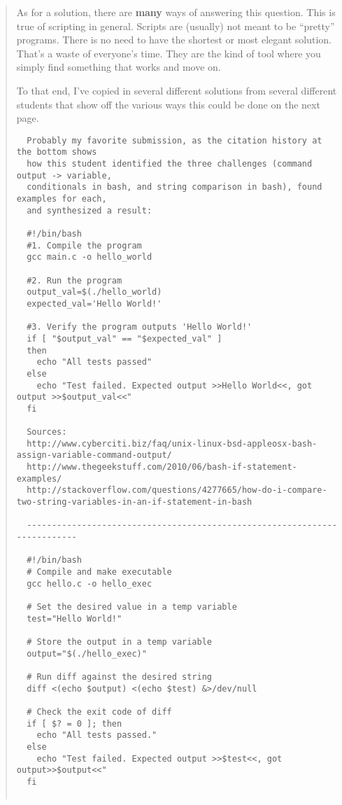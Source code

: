 \documentclass{article}
\begin{document}
\begin{quote}
  \color{violet}

  As for a solution, there are \textbf{many} ways of answering this question.
  This is true of scripting in general. Scripts are (usually) not meant to be
  ``pretty'' programs. There is no need to have the shortest or most elegant
  solution. That's a waste of everyone's time. They are the kind of tool where
  you simply find something that works and move on.

  To that end, I've copied in several different solutions from several
  different students that show off the various ways this could be done on the
  next page.

  \newpage
  \lstset{tabsize=1}
  \lstset{basicstyle=\footnotesize\ttfamily}
  \begin{lstlisting}
  Probably my favorite submission, as the citation history at the bottom shows
  how this student identified the three challenges (command output -> variable,
  conditionals in bash, and string comparison in bash), found examples for each,
  and synthesized a result:

  #!/bin/bash
  #1. Compile the program
  gcc main.c -o hello_world

  #2. Run the program
  output_val=$(./hello_world)
  expected_val='Hello World!'

  #3. Verify the program outputs 'Hello World!'
  if [ "$output_val" == "$expected_val" ]
  then
    echo "All tests passed"
  else
    echo "Test failed. Expected output >>Hello World<<, got output >>$output_val<<"
  fi

  Sources:
  http://www.cyberciti.biz/faq/unix-linux-bsd-appleosx-bash-assign-variable-command-output/
  http://www.thegeekstuff.com/2010/06/bash-if-statement-examples/
  http://stackoverflow.com/questions/4277665/how-do-i-compare-two-string-variables-in-an-if-statement-in-bash

  --------------------------------------------------------------------------

  #!/bin/bash
  # Compile and make executable
  gcc hello.c -o hello_exec

  # Set the desired value in a temp variable
  test="Hello World!"

  # Store the output in a temp variable
  output="$(./hello_exec)"

  # Run diff against the desired string
  diff <(echo $output) <(echo $test) &>/dev/null

  # Check the exit code of diff
  if [ $? = 0 ]; then
    echo "All tests passed."
  else
    echo "Test failed. Expected output >>$test<<, got output>>$output<<"
  fi


\end{lstlisting}
\end{quote}
\end{document}
